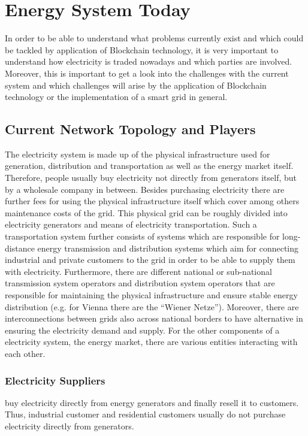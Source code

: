 \documentclass[runningheads]{llncs}
\begin{document}
\section{Energy System Today}
In order to be able to understand what problems currently exist and which could be tackled by application of Blockchain technology, it is very important to understand how electricity is traded nowadays and which parties are involved. Moreover, this is important to get a look into the challenges with the current system and which challenges will arise by the application of Blockchain technology or the implementation of a smart grid in general.

\subsection{Current Network Topology and Players}
The electricity system is made up of the physical infrastructure used for generation, distribution and transportation as well as the energy market itself. Therefore, people usually buy electricity not directly from generators itself, but by a wholesale company in between. Besides purchasing electricity there are further fees for using the physical infrastructure itself which cover among others maintenance costs of the grid.
This physical grid can be roughly divided into electricity generators and means of electricity transportation. Such a transportation system further consists of systems which are responsible for long-distance energy transmission and distribution systems which aim for connecting industrial and private customers to the grid in order to be able to supply them with electricity. Furthermore, there are different national or sub-national transmission system operators and distribution system operators that are responsible for maintaining the physical infrastructure and ensure stable energy distribution (e.g. for Vienna there are the “Wiener Netze”). Moreover, there are interconnections between grids also across national borders to have alternative in ensuring the electricity demand and supply. \cite{eu_energy_market}
For the other components of a electricity system, the energy market, there are various entities interacting with each other.

\subsubsection{Electricity Suppliers} buy electricity directly from energy generators and finally resell it to customers. Thus, industrial customer and residential customers usually do not purchase electricity directly from generators.
\end{document}
